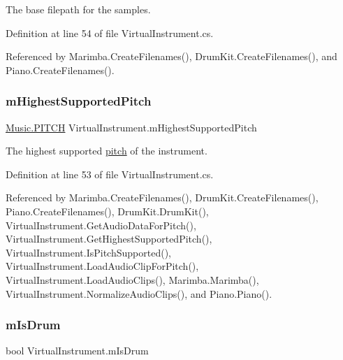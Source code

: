The base filepath for the samples. 



Definition at line 54 of file Virtual\+Instrument.\+cs.



Referenced by Marimba.\+Create\+Filenames(), Drum\+Kit.\+Create\+Filenames(), and Piano.\+Create\+Filenames().

\mbox{\label{group___v_i_base_pro_var_ga61fb2c33b53a0f663047779d7ceb18f3}} 
\subsubsection{\texorpdfstring{m\+Highest\+Supported\+Pitch}{mHighestSupportedPitch}}
{\footnotesize\ttfamily \hyperlink{group___music_enums_ga508f69b199ea518f935486c990edac1d}{Music.\+P\+I\+T\+CH} Virtual\+Instrument.\+m\+Highest\+Supported\+Pitch\hspace{0.3cm}{\ttfamily [protected]}}



The highest supported \hyperlink{group___music_enums_ga508f69b199ea518f935486c990edac1d}{pitch} of the instrument. 



Definition at line 53 of file Virtual\+Instrument.\+cs.



Referenced by Marimba.\+Create\+Filenames(), Drum\+Kit.\+Create\+Filenames(), Piano.\+Create\+Filenames(), Drum\+Kit.\+Drum\+Kit(), Virtual\+Instrument.\+Get\+Audio\+Data\+For\+Pitch(), Virtual\+Instrument.\+Get\+Highest\+Supported\+Pitch(), Virtual\+Instrument.\+Is\+Pitch\+Supported(), Virtual\+Instrument.\+Load\+Audio\+Clip\+For\+Pitch(), Virtual\+Instrument.\+Load\+Audio\+Clips(), Marimba.\+Marimba(), Virtual\+Instrument.\+Normalize\+Audio\+Clips(), and Piano.\+Piano().

\mbox{\label{group___v_i_base_pro_var_ga47dbd8aa02ab32b8f802adfd2d3d81de}} 
\subsubsection{\texorpdfstring{m\+Is\+Drum}{mIsDrum}}
{\footnotesize\ttfamily bool Virtual\+Instrument.\+m\+Is\+Drum\hspace{0.3cm}{\ttfamily [protected]}}



